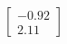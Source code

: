 \documentclass[preview]{standalone}
\begin{document}
\begin{align*}
\begin{bmatrix} -0.92 \\ 2.11 \end{bmatrix}
\end{align*}
\end{document}
